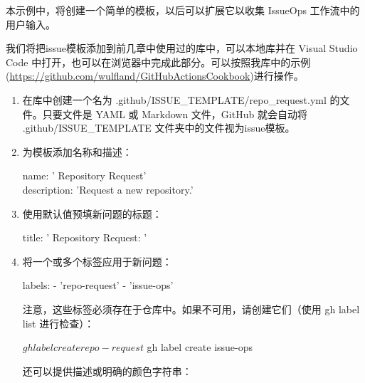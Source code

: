 本示例中，将创建一个简单的模板，以后可以扩展它以收集 IssueOps 工作流中的用户输入。


我们将把issue模板添加到前几章中使用过的库中，可以本地库并在 Visual Studio Code 中打开，也可以在浏览器中完成此部分。可以按照我库中的示例(\url{https://github.com/wulfland/GitHubActionsCookbook})进行操作。


\begin{enumerate}
\item 
在库中创建一个名为 .github/ISSUE\_TEMPLATE/repo\_request.yml 的文件。只要文件是 YAML 或 Markdown 文件，GitHub 就会自动将 .github/ISSUE\_TEMPLATE 文件夹中的文件视为issue模板。

\item 
为模板添加名称和描述：

\begin{tcolorbox}[ breakable,colback = bashcodebg, colframe= black!50!white]
\scriptsize{
name: ' Repository Request'\\
description: 'Request a new repository.'
}
\end{tcolorbox}

\item 
使用默认值预填新问题的标题：

\begin{tcolorbox}[ breakable,colback = bashcodebg, colframe= black!50!white]
\scriptsize{
title: ' Repository Request: '
}
\end{tcolorbox}

\item 
将一个或多个标签应用于新问题：

\begin{shell}
labels:
  - 'repo-request'
  - 'issue-ops'
\end{shell}

注意，这些标签必须存在于仓库中。如果不可用，请创建它们（使用 gh label list 进行检查）：

\begin{shell}
$ gh label create repo-request
$ gh label create issue-ops
\end{shell}

还可以提供描述或明确的颜色字符串：



\end{enumerate}
